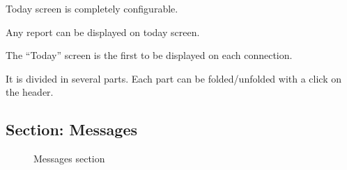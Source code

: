 \documentclass[letterpaper,10pt,english]{sphinxmanual}
\begin{document}
Today screen is completely configurable.

Any report can be displayed on today screen.

The “Today” screen is the first to be displayed on each connection.

It is divided in several parts. Each part can be folded/unfolded with a click on the header.


\subsection{Section: Messages}
\label{Today:section-messages}\begin{figure}[htbp]
\centering
\capstart

\caption{Messages section}\end{figure}
\end{document}
